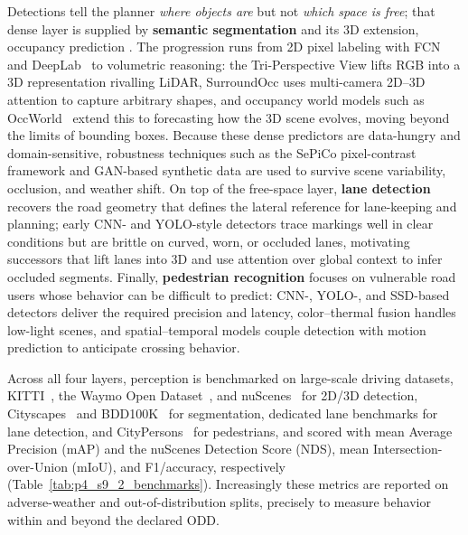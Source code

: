 Detections tell the planner \emph{where objects are} but not \emph{which space is free}; that dense layer is supplied by \textbf{semantic segmentation} and its 3D extension, occupancy prediction \cite{ZhouBWN20,NestiRNBB22}. The progression runs from 2D pixel labeling with FCN~\cite{long2015fcn} and DeepLab~\cite{chen2017deeplabv2} to volumetric reasoning: the Tri-Perspective View \cite{HuangZZ0L23} lifts RGB into a 3D representation rivalling LiDAR, SurroundOcc \cite{WeiZZZZL23} uses multi-camera 2D--3D attention to capture arbitrary shapes, and occupancy world models such as OccWorld~\cite{zheng2024occworld} extend this to forecasting how the 3D scene evolves, moving beyond the limits of bounding boxes. Because these dense predictors are data-hungry and domain-sensitive, robustness techniques such as the SePiCo pixel-contrast framework \cite{XieLLLHW23} and GAN-based synthetic data \cite{AbdollahiPSMA21} are used to survive scene variability, occlusion, and weather shift. On top of the free-space layer, \textbf{lane detection} recovers the road geometry that defines the lateral reference for lane-keeping and planning; early CNN- and YOLO-style detectors trace markings well in clear conditions but are brittle on curved, worn, or occluded lanes, motivating successors that lift lanes into 3D and use attention over global context to infer occluded segments. 
Finally, \textbf{pedestrian recognition} focuses on vulnerable road users whose behavior can be difficult to predict: CNN-, YOLO-, and SSD-based detectors deliver the required precision and latency, color--thermal fusion handles low-light scenes, and spatial--temporal models couple detection with motion prediction to anticipate crossing behavior.

Across all four layers, perception is benchmarked on large-scale driving datasets, KITTI~\cite{KITTI-GeigerLU12}, the Waymo Open Dataset~\cite{WaymoOpen-SunKDCPTGZCCVHN20}, and nuScenes~\cite{caesar2020nuscenes} for 2D/3D detection, Cityscapes~\cite{cordts2016cityscapes} and BDD100K~\cite{yu2020bdd100k} for segmentation, dedicated lane benchmarks for lane detection, and CityPersons~\cite{zhang2017citypersons} for pedestrians, and scored with mean Average Precision (mAP) and the nuScenes Detection Score (NDS), mean Intersection-over-Union (mIoU), and F1/accuracy, respectively (Table~\ref{tab:p4_s9_2_benchmarks}). Increasingly these metrics are reported on adverse-weather and out-of-distribution splits, precisely to measure behavior within and beyond the declared ODD.

